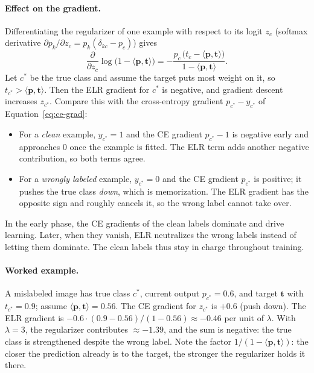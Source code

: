 \paragraph{Effect on the gradient.}
Differentiating the regularizer of one example with respect to its logit
$z_c$ (softmax derivative $\partial p_k/\partial z_c=p_k(\delta_{kc}-p_c)$)
gives
\begin{equation}
  \frac{\partial}{\partial z_c}\log\bigl(1-\langle\mathbf p,\mathbf t\rangle\bigr)
  = -\frac{p_c\,\bigl(t_c-\langle\mathbf p,\mathbf t\rangle\bigr)}
    {1-\langle\mathbf p,\mathbf t\rangle}.
  \label{eq:elr-grad}
\end{equation}
Let $c^*$ be the true class and assume the target puts most weight on it, so
$t_{c^*}>\langle\mathbf p,\mathbf t\rangle$. Then the ELR gradient for $c^*$
is negative, and gradient descent increases $z_{c^*}$. Compare this with the
cross-entropy gradient $p_{c^*}-y_{c^*}$ of Equation~\ref{eq:ce-grad}:
\begin{itemize}
  \item For a \emph{clean} example, $y_{c^*}=1$ and the CE gradient
    $p_{c^*}-1$ is negative early and approaches $0$ once the example is
    fitted. The ELR term adds another negative contribution, so both terms
    agree.
  \item For a \emph{wrongly labeled} example, $y_{c^*}=0$ and the CE gradient
    $p_{c^*}$ is positive; it pushes the true class \emph{down}, which is
    memorization. The ELR gradient has the opposite sign and roughly
    cancels it, so the wrong label cannot take over.
\end{itemize}
In the early phase, the CE gradients of the clean labels dominate and drive
learning. Later, when they vanish, ELR neutralizes the wrong labels instead
of letting them dominate. The clean labels thus stay in charge throughout
training.

\paragraph{Worked example.}
A mislabeled image has true class $c^*$, current output $p_{c^*}=0.6$, and
target $\mathbf t$ with $t_{c^*}=0.9$; assume $\langle\mathbf p,\mathbf
t\rangle=0.56$. The CE gradient for $z_{c^*}$ is $+0.6$ (push down). The ELR
gradient is $-0.6\cdot(0.9-0.56)/(1-0.56)\approx-0.46$ per unit of $\lambda$.
With $\lambda=3$, the regularizer contributes $\approx-1.39$, and the sum is
negative: the true class is strengthened despite the wrong label. Note the
factor $1/(1-\langle\mathbf p,\mathbf t\rangle)$: the closer the prediction
already is to the target, the stronger the regularizer holds it there.

